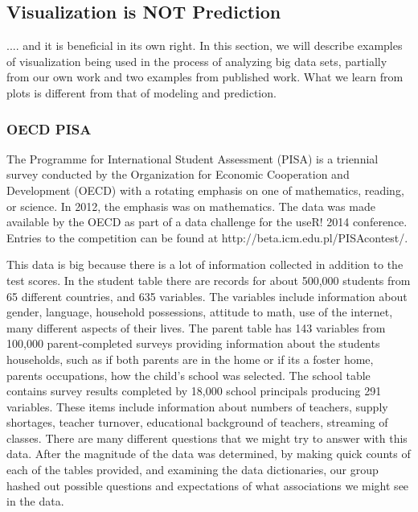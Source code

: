 \documentclass{article}
\begin{document}
\subsection{Visualization is NOT Prediction}

{\color[rgb]{1,0,0} .... and it is beneficial in its own right.} In this section, we will describe examples of visualization being used in the process of analyzing big data sets, partially from our own work and two examples from published work. What we learn from plots is different from that of modeling and prediction.


\subsubsection{OECD PISA}

The Programme for International Student Assessment (PISA) is a triennial survey conducted by the Organization for Economic Cooperation and Development (OECD) with a rotating emphasis on one of mathematics, reading, or science. In 2012, the emphasis was on mathematics. The data was made available by the OECD as part of a data challenge for the useR! 2014 conference. Entries to the competition can be found at http://beta.icm.edu.pl/PISAcontest/.

This data is big because there is a lot of information collected in addition to the test scores. In the student table there are records for about 500,000 students from 65 different countries, and 635 variables. The variables include information about gender, language, household possessions, attitude to math, use of the internet, many different aspects of their lives. The parent table has 143 variables from 100,000 parent-completed surveys providing information about the students households, such as if both parents are in the home or if its a foster home, parents occupations, how the child's school was selected. The school table contains survey results completed by 18,000 school principals producing 291 variables. These items include information about numbers of teachers, supply shortages, teacher turnover, educational background of teachers, streaming of classes. There are many different questions that we might try to answer with this data. After the magnitude of the data was determined, by making quick counts of each of the tables provided, and examining the data dictionaries, our group hashed out possible questions and expectations of what associations we might see in the data.
\end{document}
